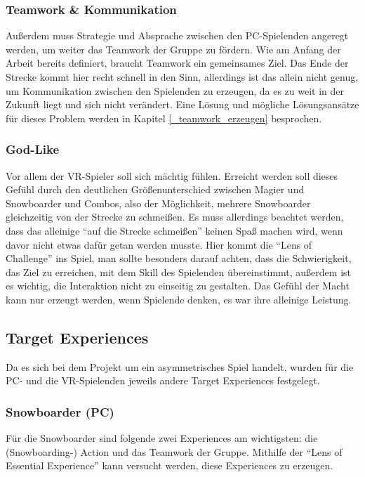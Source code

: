 \subsubsection{Teamwork \& Kommunikation}
Außerdem muss Strategie und Absprache zwischen den PC-Spielenden angeregt werden, um weiter das Teamwork der Gruppe zu fördern. Wie am Anfang der Arbeit bereits definiert, braucht Teamwork ein gemeinsames Ziel. Das Ende der Strecke kommt hier recht schnell in den Sinn, allerdings ist das allein nicht genug, um Kommunikation zwischen den Spielenden zu erzeugen, da es zu weit in der Zukunft liegt und sich nicht verändert. Eine Lösung und mögliche Lösungsansätze für dieses Problem werden in Kapitel \ref{_teamwork_erzeugen} besprochen.

\subsubsection{God-Like}
Vor allem der VR-Spieler soll sich mächtig fühlen. Erreicht werden soll dieses Gefühl durch den deutlichen Größenunterschied zwischen Magier und Snowboarder und Combos, also der Möglichkeit, mehrere Snowboarder gleichzeitig von der Strecke zu schmeißen. Es muss allerdings beachtet werden, dass das alleinige "`auf die Strecke schmeißen"' keinen Spaß machen wird, wenn davor nicht etwas dafür getan werden musste. Hier kommt die "`Lens of Challenge"'\cite{_art_of_gamedesign} ins Spiel, man sollte besonders darauf achten, dass die Schwierigkeit, das Ziel zu erreichen, mit dem Skill des Spielenden übereinstimmt, außerdem ist es wichtig, die Interaktion nicht zu einseitig zu gestalten. Das Gefühl der Macht kann nur erzeugt werden, wenn Spielende denken, es war ihre alleinige Leistung.

\subsection{Target Experiences}

Da es sich bei dem Projekt um ein asymmetrisches Spiel handelt, wurden für die PC- und die VR-Spielenden jeweils andere Target Experiences festgelegt.

\subsubsection{Snowboarder (PC)}
Für die Snowboarder sind folgende zwei Experiences am wichtigsten: die (Snowboarding-) Action und das Teamwork der Gruppe. Mithilfe der "`Lens of Essential Experience"'\cite[S. 55]{_art_of_gamedesign} kann versucht werden, diese Experiences zu erzeugen.

